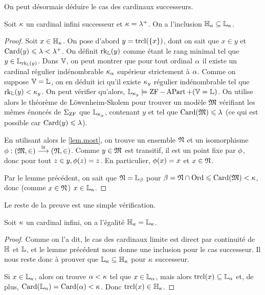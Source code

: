 \noindent
On peut désormais déduire le cas des cardinaux successeurs.

\begin{lemma}
  Soit $\kappa$ un cardinal infini successeur et $\kappa = \lambda^{+}$. On a
  l'inclusion $\mathbb H_\kappa \subseteq \mathbb L_\kappa$.
\end{lemma}

\begin{proof}
  Soit $x \in \mathbb H_\kappa$. On pose d'abord $y = \operatorname{trcl}(\{x\})$, dont on sait que
  $x \in y$ et $\operatorname{Card}(y) \leqslant \lambda < \lambda^{+}$. On définit
  $\operatorname{rk}_{\mathbb L}(y)$ comme étant le rang minimal tel que
  $y\in\mathbb L_{\operatorname{rk}_{\mathbb L}(y)}$.
  Dans $\mathbb V$, on peut montrer que pour tout ordinal $\alpha$ il existe un
  cardinal régulier indénombrable $\kappa_{\alpha}$ supérieur strictement à
  $\alpha$. Comme on suppose $\mathbb V = \mathbb L$, on en déduit ici qu'il existe $\kappa_y$
  régulier indénombrable tel que $\operatorname{rk}_{\mathbb L}(y) < \kappa_y$.
  On peut vérifier qu'alors,
  $\mathbb L_{\kappa_y}\models \operatorname{ZF} - \operatorname{APart} + (\mathbb V = \mathbb L)$. On utilise alors le
  théorème de Löwenheim-Skolem pour trouver un modèle $\mathfrak{M}$ vérifiant les
  mêmes énoncés de $\Sigma_{\operatorname{ZF}}$ que $\mathbb L_{\kappa_y}$, contenant $y$ et tel que
  $\operatorname{Card}(\mathfrak{M}) \leqslant \lambda$ (ce qui est possible car $\operatorname{Card}(y)\leqslant \lambda$).

  En utilisant alors le \cref{lem.most}, on trouve un ensemble $\mathfrak{N}$ et un
  isomorphisme $\phi : \displaystyle (\mathfrak{M},\in) \overset{\cong}{\longrightarrow} (\mathfrak{N},\in)$. Comme
  $y\in \mathfrak{M}$ est transitif, il est un point fixe par $\phi$, donc pour
  tout $z\in y, \phi(z) = z$. En particulier, $\phi(x) = x$ et
  $x\in \mathfrak{N}$.

  Par le lemme précédent, on sait que $\mathfrak{N} = \mathbb L_{\beta}$ pour
  $\beta = \mathfrak{N}\cap\operatorname{Ord} \leqslant \operatorname{Card}(\mathfrak{M}) < \kappa$, donc (comme
  $x \in \mathfrak{N}$) $x \in \mathbb L_{\kappa}$.
\end{proof}

\noindent
Le reste de la preuve est une simple vérification.

\begin{lemma}
  Soit $\kappa$ un cardinal infini, on a l'égalité $\mathbb H_\kappa = \mathbb L_\kappa$.
\end{lemma}

\begin{proof}
  Comme on l'a dit, le cas des cardinaux limite est direct par continuité de
  $\mathbb H$ et $\mathbb L$, et le lemme précédent nous donne une inclusion pour le cas
  successeur. Il nous reste donc à prouver que $\mathbb L_\kappa\subseteq\mathbb H_\kappa$
  pour $\kappa$ successeur.

  Si $x\in \mathbb L_\kappa$, alors on trouve $\alpha < \kappa$ tel que $x\in \mathbb L_{\alpha}$,
  mais alors $\operatorname{trcl}(x)\subseteq \mathbb L_{\alpha}$ et, de plus,
  $\operatorname{Card}(\mathbb L_{\alpha}) = \operatorname{Card}(\alpha) < \kappa$.
  Donc $\operatorname{trcl}(x)\in\mathbb H_\kappa$.
\end{proof}

